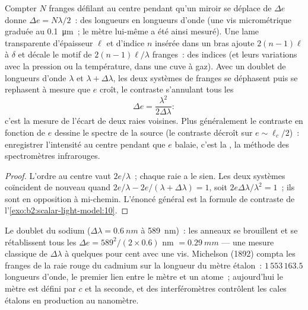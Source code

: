\begin{proposition}\label{prop:b2:michelson:measure}
Compter $N$ franges défilant au centre pendant qu'un miroir se déplace de $\Delta e$
donne $\Delta e = N\lambda/2$~: des longueurs en longueurs d'onde (une vis micrométrique
graduée au \qty{0.1}{\micro m}~; le mètre lui-même a été ainsi mesuré). Une
lame transparente d'épaisseur $\ell$ et d'indice $n$ insérée dans un bras
ajoute $2(n - 1)\ell$ à $\delta$ et décale le motif de $2(n - 1)\ell/\lambda$
franges~: des indices (et leurs variations avec la pression ou la température,
dans une cuve à gaz). Avec un doublet de longueurs d'onde $\lambda$ et $\lambda + \Delta\lambda$, les
deux systèmes de franges se déphasent puis se rephasent à mesure que $e$ croît, le
contraste s'annulant tous les
\[
\Delta e = \frac{\lambda^2}{2\Delta\lambda} :
\]
c'est la mesure de l'écart de deux raies voisines. Plus généralement le contraste en
fonction de $e$ dessine le spectre de la source (le contraste
décroît sur $e \sim \ell_c/2$)~: enregistrer l'intensité au centre pendant que
$e$ balaie, c'est la \emph{}, la méthode des
spectromètres infrarouges.
\end{proposition}

\begin{proof}
L'ordre au centre vaut $2e/\lambda$~; chaque raie a le sien. Les deux
systèmes coïncident de nouveau quand $2e/\lambda - 2e/(\lambda + \Delta\lambda) = 1$, soit $2e\Delta\lambda
/\lambda^2 = 1$~; ils sont en opposition à mi-chemin. L'énoncé général est
la formule de contraste de l'\cref{exo:b2:scalar-light-model:10}.
\end{proof}

\begin{example}\label{ex:b2:michelson:sodium}
Le doublet du sodium ($\Delta\lambda = \qty{0.6}{nm}$ à \qty{589}{nm})~: les anneaux se brouillent et
se rétablissent tous les $\Delta e = 589^2/(2 \times 0.6)$ nm $= \qty{0.29}{mm}$ --- une mesure
classique de $\Delta\lambda$ à quelques pour cent avec une vis. Michelson (1892)
compta les franges de la raie rouge du cadmium sur la longueur du
mètre étalon~: $1\,553\,163.5$ longueurs d'onde, le premier lien entre le
mètre et un atome~; aujourd'hui le mètre est défini par $c$ et la
seconde, et des interféromètres contrôlent les cales étalons en production au
nanomètre.
\end{example}

